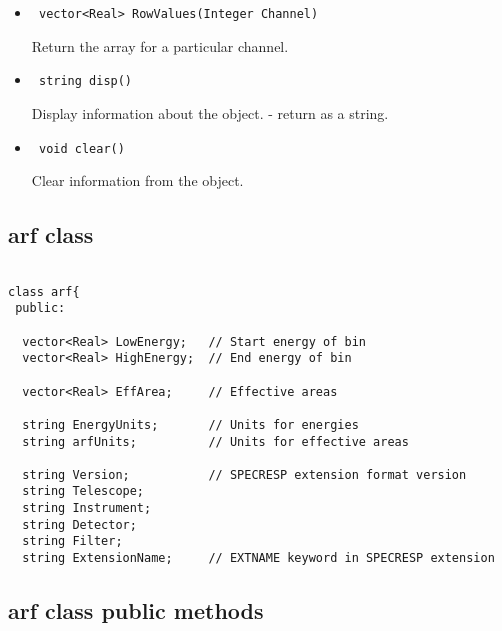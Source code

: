\documentclass[11pt]{book}
\begin{document}
\begin{itemize}
\item  \begin{verbatim} vector<Real> RowValues(Integer Channel) \end{verbatim}

          Return the array for a particular channel.

\item  \begin{verbatim} string disp() \end{verbatim}

          Display information about the object. - return as a string.

\item  \begin{verbatim} void clear() \end{verbatim}

          Clear information from the object.

\end{itemize}


\subsection{arf class}


\begin{verbatim}

class arf{
 public:

  vector<Real> LowEnergy;   // Start energy of bin
  vector<Real> HighEnergy;  // End energy of bin

  vector<Real> EffArea;     // Effective areas

  string EnergyUnits;       // Units for energies
  string arfUnits;          // Units for effective areas

  string Version;           // SPECRESP extension format version
  string Telescope;                             
  string Instrument;
  string Detector;
  string Filter;
  string ExtensionName;     // EXTNAME keyword in SPECRESP extension

\end{verbatim}


\subsection{arf class public methods}
\end{document}
